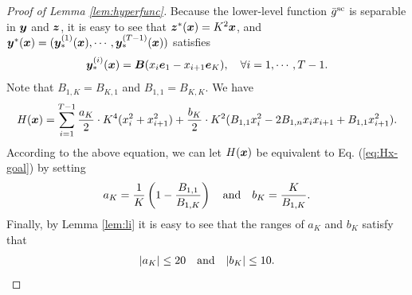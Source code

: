 \begin{proof}[Proof of Lemma \ref{lem:hyperfunc}]
Because the lower-level function $\bar g^{\rm sc}$ is separable in ${\bm{y}}$ and ${\bm{z}}$, it is easy to see that ${\bm{z}}^*({\bm{x}}) = K^2 {\bm{x}}$, and ${\bm{y}}^*({\bm{x}}) = ({\bm{y}}^{(1)}_*({\bm{x}}),\cdots, {\bm{y}}^{(T-1)}_*({\bm{x}}))$ satisfies 
\begin{align*} 
    {\bm{y}}^{(i)}_*({\bm{x}}) =
    {\bm{B}} (x_{i} {\bm{e}}_1 - x_{i+1} {\bm{e}}_K), \quad \forall i = 1,\cdots,T-1.
\end{align*}
Note that $B_{1,K} = B_{K,1}$ and $B_{1,1} = B_{K,K}$. We have
\begin{align} \label{eq:close-Hx}
    H({\bm{x}}) = \sum_{i=1}^{T-1} \frac{a_K}{2} \cdot K^4 (x_i^2 +x_{i+1}^2) + \frac{b_K}{2} \cdot K^2 ( B_{1,1} x_i^2 - 2 B_{1,n} x_i x_{i+1} + B_{1,1} x_{i+1}^2).
\end{align}
According to the above equation, we can let $H({\bm{x}})$ be equivalent to Eq. (\ref{eq:Hx-goal}) by setting
\begin{align} \label{eq:setting-alpha-beta}
    a_K = \frac{1}{K} \left( 1 - \frac{B_{1,1}}{B_{1,K}} \right) \quad {\rm and} \quad b_K = \frac{K}{B_{1,K}}.
\end{align}
Finally, by Lemma \ref{lem:li} it is easy to see that the ranges of $a_K$ and $b_K$ satisfy that
\begin{align*}
    \vert a_K \vert \le 20 \quad {\rm and }\quad \vert b_K \vert \le 10.
\end{align*}

\end{proof}
